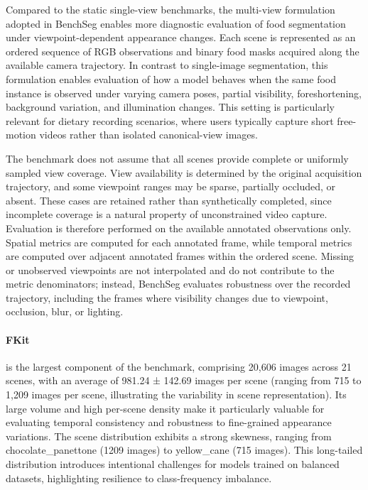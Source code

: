 \documentclass[preprint,12pt]{elsarticle}
\begin{document}
Compared to the static single-view benchmarks, the multi-view formulation adopted in BenchSeg enables more diagnostic evaluation of food segmentation under viewpoint-dependent appearance changes. Each scene is represented as an ordered sequence of RGB observations and binary food masks acquired along the available camera trajectory. In contrast to single-image segmentation, this formulation enables evaluation of how a model behaves when the same food instance is observed under varying camera poses, partial visibility, foreshortening, background variation, and illumination changes. This setting is particularly relevant for dietary recording scenarios, where users typically capture short free-motion videos rather than isolated canonical-view images. 

The benchmark does not assume that all scenes provide complete or uniformly sampled view coverage. View availability is determined by the original acquisition trajectory, and some viewpoint ranges may be sparse, partially occluded, or absent. These cases are retained rather than synthetically completed, since incomplete coverage is a natural property of unconstrained video capture. Evaluation is therefore performed on the available annotated observations only. Spatial metrics are computed for each annotated frame, while temporal metrics are computed over adjacent annotated frames within the ordered scene. Missing or unobserved viewpoints are not interpolated and do not contribute to the metric denominators; instead, BenchSeg evaluates robustness over the recorded trajectory, including the frames where visibility changes due to viewpoint, occlusion, blur, or lighting. 

\paragraph{\textbf{FKit}} is the largest component of the benchmark, comprising 20,606 images across 21 scenes, with an average of 981.24 ± 142.69 images per scene (ranging from 715 to 1,209 images per scene, illustrating the variability in scene representation). Its large volume and high per-scene density make it particularly valuable for evaluating temporal consistency and robustness to fine-grained appearance variations. The scene distribution exhibits a strong skewness, ranging from chocolate\_panettone (1209 images) to yellow\_cane (715 images). This long-tailed distribution introduces intentional challenges for models trained on balanced datasets, highlighting resilience to class-frequency imbalance.
\end{document}
